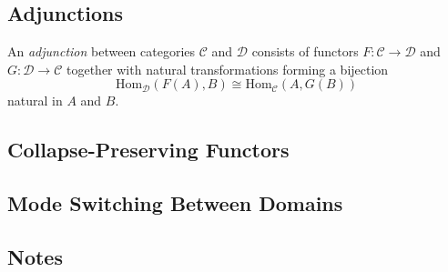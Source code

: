 
\subsection{Adjunctions}
\begin{definition}
An \emph{adjunction} between categories $\mathcal{C}$ and $\mathcal{D}$
consists of functors $F : \mathcal{C} \to \mathcal{D}$ and
$G : \mathcal{D} \to \mathcal{C}$ together with natural transformations
forming a bijection
\[
\mathrm{Hom}_{\mathcal{D}}(F(A),B) \cong \mathrm{Hom}_{\mathcal{C}}(A,G(B))
\]
natural in $A$ and $B$.
\end{definition}


\subsection{Collapse-Preserving Functors}

\subsection{Mode Switching Between Domains}

\subsection{Notes}

